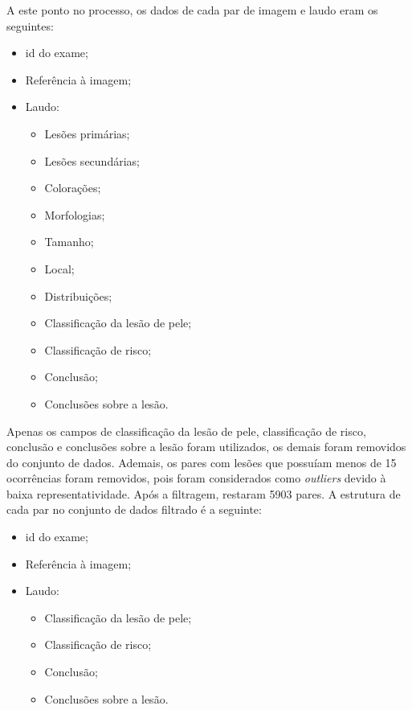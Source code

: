 A este ponto no processo, os dados de cada par de imagem e laudo eram os seguintes:

\begin{itemize}
    \item \ac{id} do exame;
    \item Referência à imagem;
    \item Laudo:
          \begin{itemize}
              \item Lesões primárias;
              \item Lesões secundárias;
              \item Colorações;
              \item Morfologias;
              \item Tamanho;
              \item Local;
              \item Distribuições;
              \item Classificação da lesão de pele;
              \item Classificação de risco;
              \item Conclusão;
              \item Conclusões sobre a lesão.
          \end{itemize}
\end{itemize}

Apenas os campos de classificação da lesão de pele, classificação de risco, conclusão e conclusões sobre a lesão foram
utilizados, os demais foram removidos do conjunto de dados. Ademais, os pares com lesões que possuíam menos de 15
ocorrências foram removidos, pois foram considerados como \textit{outliers} devido à baixa representatividade. Após a
filtragem, restaram 5903 pares. A estrutura de cada par no conjunto de dados filtrado é a seguinte:

\begin{itemize}
    \item \ac{id} do exame;
    \item Referência à imagem;
    \item Laudo:
          \begin{itemize}
              \item Classificação da lesão de pele;
              \item Classificação de risco;
              \item Conclusão;
              \item Conclusões sobre a lesão.
          \end{itemize}
\end{itemize}

